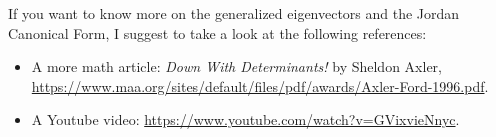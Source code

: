\documentclass[12pt,a4paper]{article}
\begin{document}
	If you want to know more on the generalized eigenvectors and the Jordan Canonical Form, I suggest to take a look at the following references:
	\begin{itemize}
	\item A more math article: \textit{Down With Determinants!} by Sheldon Axler, \url{https://www.maa.org/sites/default/files/pdf/awards/Axler-Ford-1996.pdf}.
	\item A Youtube video: \url{https://www.youtube.com/watch?v=GVixvieNnyc}.
	\end{itemize}
\end{document}
